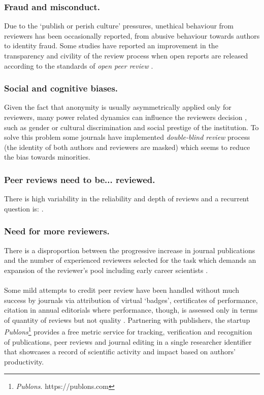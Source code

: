 \documentclass[runningheads]{llncs}
\begin{document}
\subsubsection{Fraud and misconduct.} Due to the `publish or perish culture' pressures, unethical behaviour from reviewers has been occasionally reported, from abusive behaviour towards authors \cite{Smith2006,tragedy-reviewers} to identity fraud. Some studies have reported an improvement in the transparency and civility of the review process when open reports are released according to the standards of \emph{open peer review} \cite{PeerRev-NatComm}.
\subsubsection{Social and cognitive biases.} Given the fact that anonymity is usually asymmetrically applied only for reviewers, many power related dynamics can influence the reviewers decision \cite{Tennant2017-F1000R}, such as gender or cultural discrimination and social prestige of the institution. To solve this problem some journals have implemented \emph{double-blind review} process (the identity of both authors and reviewers are masked) which seems to reduce the bias towards minorities.
\subsubsection{Peer reviews need to be... reviewed.} There is high variability in the reliability and depth of reviews and a recurrent question is:  \cite{Tennant2017-F1000R}.
\subsubsection{Need for more reviewers.} There is a disproportion between the progressive increase in journal publications and the number of experienced reviewers selected for the task which demands an expansion of the reviewer's pool including early career scientists \cite{tragedy-reviewers,Warne-RewRev}.
\\
\\
Some mild attempts to credit peer review have been handled without much success by journals via attribution of virtual `badges', certificates of performance, citation in annual editorials \cite{Tennant2017-F1000R} where performance, though, is assessed only in terms of quantity of reviews but not quality \cite{Warne-RewRev}.
\newline Partnering with publishers, the startup \emph{Publons}\footnote[1]{\emph{Publons}. https://publons.com} provides a free metric service for tracking, verification and recognition of publications, peer reviews and journal editing in a single researcher identifier that showcases a record of scientific activity and impact based on authors' productivity.
\end{document}
